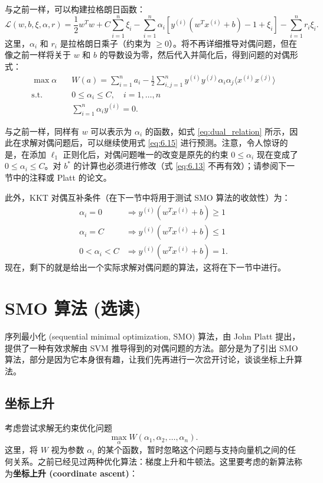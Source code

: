 与之前一样，可以构建拉格朗日函数：
\[
    \mathcal{L}(w, b, \xi, \alpha, r) = \frac{1}{2} w^T w + C \sum_{i=1}^n \xi_i - \sum_{i=1}^n \alpha_i [y^{(i)}(w^T x^{(i)} + b) - 1 + \xi_i] - \sum_{i=1}^n r_i \xi_i.
\]
这里，$\alpha_i$ 和 $r_i$ 是拉格朗日乘子（约束为 $\ge 0$）。将不再详细推导对偶问题，但在像之前一样将关于 $w$ 和 $b$ 的导数设为零，然后代入并简化后，得到问题的对偶形式：
\begin{align*}
    \max{\alpha} \quad& W(a)=\sum_{i=1}^{n}a_i - \frac12 \sum_{i,j=1}^n y^{(i)}y^{(j)}\alpha_i\alpha_j\langle x^{(i)}x^{(j)} \rangle \\
    \text{s.t.} \quad& 0\le \alpha_i\le C, \quad i=1,\dots,n \\
    &\sum_{i=1}^{n}\alpha_i y^{(i)}=0.
\end{align*}

与之前一样，同样有 $w$ 可以表示为 $\alpha_i$ 的函数，如式 \eqref{eq:dual_relation} 所示，因此在求解对偶问题后，可以继续使用式 \eqref{eq:6.15} 进行预测。注意，令人惊讶的是，在添加 $\ell_1$ 正则化后，对偶问题唯一的改变是原先的约束 $0 \le \alpha_i$ 现在变成了 $0 \le \alpha_i \le C$。对 $b^*$ 的计算也必须进行修改（式 \eqref{eq:6.13} 不再有效）；请参阅下一节中的注释或 Platt 的论文。

此外，KKT 对偶互补条件（在下一节中将用于测试 SMO 算法的收敛性）为：
\begin{align}
    \alpha_i = 0 &\Rightarrow y^{(i)}(w^T x^{(i)} + b) \ge 1 \label{eq:6.16} \\
    \alpha_i = C &\Rightarrow y^{(i)}(w^T x^{(i)} + b) \le 1 \label{eq:6.17} \\
    0 < \alpha_i < C &\Rightarrow y^{(i)}(w^T x^{(i)} + b) = 1. \label{eq:6.18}
\end{align}
现在，剩下的就是给出一个实际求解对偶问题的算法，这将在下一节中进行。

\section{SMO 算法 (选读)}

序列最小化 (sequential minimal optimization, SMO) 算法，由 John Platt 提出，提供了一种有效求解由 SVM 推导得到的对偶问题的方法。部分是为了引出 SMO 算法，部分是因为它本身很有趣，让我们先再进行一次岔开讨论，谈谈坐标上升算法。

\subsection{坐标上升}

考虑尝试求解无约束优化问题
\[
    \max_\alpha W(\alpha_1, \alpha_2, \dots, \alpha_n).
\]
这里，将 $W$ 视为参数 $\alpha_i$ 的某个函数，暂时忽略这个问题与支持向量机之间的任何关系。之前已经见过两种优化算法：梯度上升和牛顿法。这里要考虑的新算法称为\textbf{坐标上升 (coordinate ascent)}：

